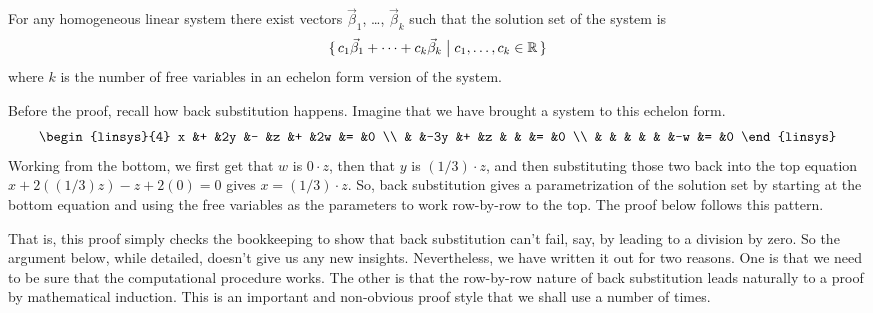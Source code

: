 
\begin{lemma}
\label{le:HomoSltnSpanVecs}
For any  homogeneous linear system there exist
vectors $\vec{\beta}_1$, \ldots, $\vec{\beta}_k$ such that the 
solution set of the system is
\begin{equation*}
  \mbox{$\{\,c_1\vec{\beta}_1+\cdots+c_k\vec{\beta}_k \bigm| c_1,\ldots,c_k\in\mathbb{R}\,\}$}
\end{equation*}
where $k$ is the
number of free variables in an echelon form version of the system.
\end{lemma}

Before the proof, recall how back substitution happens.
Imagine that we have brought a system to this echelon form.
\begin{equation*}
  \begin{linsys}{4}
     x  &+  &2y  &-  &z  &+  &2w &=  &0  \\
        &   &-3y &+  &z  &   &   &=  &0  \\
        &   &    &   &   &   &-w &=  &0  
  \end{linsys}
\end{equation*}
Working from the bottom, we first get that \( w \) is \( 0\cdot z \), 
then that \( y \) is \( (1/3)\cdot z \), and then
substituting those two back into the top equation
\( x+2((1/3)z)-z+2(0)=0 \) gives \( x=(1/3)\cdot z \).
So, back substitution gives a parametrization of the solution set by
starting at the bottom equation and using the free variables as the
parameters to work row-by-row to the top.
The proof below follows this pattern.
 
That is, 
this proof simply checks the bookkeeping  
to show that back substitution can't fail,
say, by leading to a division by zero.
So the argument below, while detailed, doesn't give us any new insights.
Nevertheless, we have written it out for two reasons.
One is that we need to be sure that the
computational procedure works.
The other is that the row-by-row nature of
back substitution leads naturally to a proof by
mathematical induction.%
%
%
This is an important and non-obvious proof style that we shall
use a number of times.

